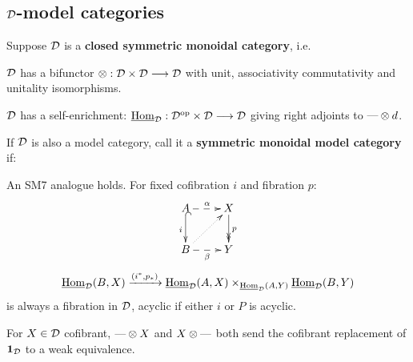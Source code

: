 \documentclass[11pt]{article}
\begin{document}
\begin{MichaelStableModelCats}
\subsection*{$\mathcal{D}$-model categories}
\begin{itemise}
\item Suppose $\mathcal{D}$ is a \textbf{closed symmetric monoidal category}, i.e.
\begin{itemise}
\item $\mathcal{D}$ has a bifunctor $\otimes:\mathcal{D}\times\mathcal{D}\longrightarrow\mathcal{D}$ with unit, associativity commutativity and unitality isomorphisms.
\item $\mathcal{D}$ has a self-enrichment: $\operatorname{\underline{Hom}}_{\mathcal{D}}:\mathcal{D}^{\textup{op}}\times\mathcal{D}\longrightarrow\mathcal{D}$ giving right adjoints to $\textup{---}\otimes d$.
\end{itemise}
\item If $\mathcal{D}$ is also a model category, call it a \textbf{symmetric monoidal model category} if:
\begin{itemise}
\item An SM7 analogue holds. For fixed cofibration $i$ and fibration $p$:
\[\xymatrix{
A\ar@{-->}[r]^\alpha\ar@{^{(}->}[d]_i&X\ar@{->>}[d]^p\\
B\ar@{-->}[r]_\beta\ar@{..>}[ur]&Y
}\]
 \[\operatorname{\underline{Hom}}_{\mathcal{D}}(B,X)\xrightarrow{(i^*,p_*)}\operatorname{\underline{Hom}}_{\mathcal{D}}(A,X)\times_{\operatorname{\underline{Hom}}_{\mathcal{D}}(A,Y)}\operatorname{\underline{Hom}}_{\mathcal{D}}(B,Y)\]
is always a fibration in $\mathcal{D}$, acyclic if either $i$ or $P$ is acyclic. %
\item 
For $X\in\mathcal{D}$ cofibrant, $\textup{---}\otimes X$ and $X\otimes \textup{---}$ both send the cofibrant replacement of $\textbf{1}_{\mathcal{D}}$ to a weak equivalence.


\end{itemise}
\end{itemise}
\end{MichaelStableModelCats}
\end{document}
